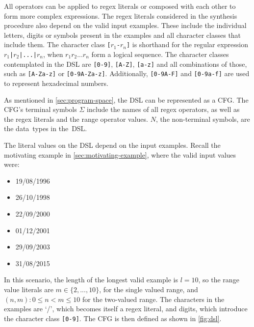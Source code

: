 All operators can be applied to regex literals or composed with each other to form more complex expressions.
The regex literals considered in the synthesis procedure also depend on the valid input examples. These include the individual letters, digits or symbols present in the examples and all character classes that include them.
The character class \texttt{[\(r_1\)-\(r_n\)]} is shorthand for the regular expression  \texttt{\(r_1\)|\(r_2\)|...|\(r_n\)}, when \(r_1 r_2 ... r_n\) form a logical sequence.
The character classes contemplated in the DSL are \texttt{[0-9]}, \texttt{[A-Z]}, \texttt{[a-z]} and all combinations of those, such as \texttt{[A-Za-z]} or \texttt{[0-9A-Za-z]}. Additionally, \texttt{[0-9A-F]} and \texttt{[0-9a-f]} are used to represent hexadecimal numbers.

As mentioned in \autoref{sec:program-space}, the \ac{DSL} can be represented as a \ac{CFG}.
The \ac{CFG}'s terminal symbols \(\Sigma\) include the names of all regex operators, as well as the regex literals and the range operator values.
\(N\), the non-terminal symbols, are the data~types in the~DSL.

\begin{example}\label{ex:dsl}
The literal values on the DSL depend on the input examples.
Recall the motivating example in \autoref{sec:motivating-example}, where the valid input values were:

\begin{multicols}{3}
    \begin{itemize}[label={}]
    \item 19/08/1996
    \item 26/10/1998
    \item 22/09/2000
    \item 01/12/2001
    \item 29/09/2003
    \item 31/08/2015
    \end{itemize}
\end{multicols}

\noindent
In this scenario, the length of the longest valid example is \(l = 10\), so the range value literals are \(m \in \{2, ..., 10\}\), for the single valued range, and \((n, m): 0 \leq n < m \leq 10\) for the two-valued range. The characters in the examples are `/', which becomes itself a regex literal, and digits, which introduce the character class \texttt{[0-9]}. The \ac{CFG} is then defined as shown in \autoref{fig:dsl}.
%
\end{example}

